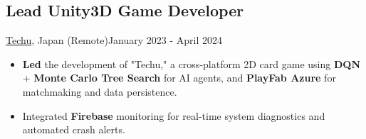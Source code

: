 \subsection{Lead Unity3D Game Developer}{\href{https://techuonthechair.com}{Techu}, Japan (Remote)}{January 2023 - April 2024}
\begin{itemize}
    \item \textbf{Led} the development of "Techu," a cross-platform 2D card game using \textbf{DQN} + \textbf{Monte Carlo Tree Search} for AI agents, and \textbf{PlayFab Azure} for matchmaking and data persistence.
    \item Integrated \textbf{Firebase} monitoring for real-time system diagnostics and automated crash alerts.
\end{itemize}
